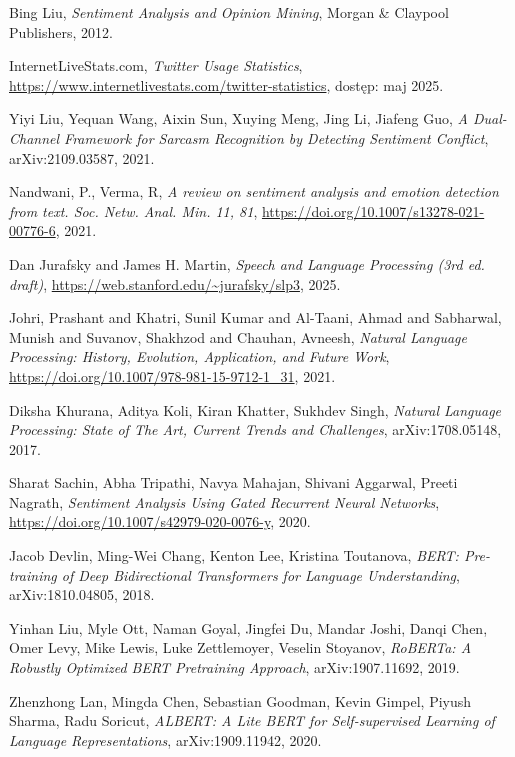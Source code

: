 Bing Liu,
\textit{Sentiment Analysis and Opinion Mining},
Morgan \& Claypool Publishers, 2012.

InternetLiveStats.com,
\textit{Twitter Usage Statistics},
\url{https://www.internetlivestats.com/twitter-statistics}, dostęp: maj 2025.

Yiyi Liu, Yequan Wang, Aixin Sun, Xuying Meng, Jing Li, Jiafeng Guo,
\textit{A Dual-Channel Framework for Sarcasm Recognition by Detecting Sentiment Conflict},
arXiv:2109.03587, 2021.

Nandwani, P., Verma, R,
\textit{A review on sentiment analysis and emotion detection from text. Soc. Netw. Anal. Min. 11, 81},
\url{https://doi.org/10.1007/s13278-021-00776-6}, 2021.

Dan Jurafsky and James H. Martin,
\textit{Speech and Language Processing (3rd ed. draft)},
\url{https://web.stanford.edu/~jurafsky/slp3}, 2025.

Johri, Prashant and Khatri, Sunil Kumar and Al-Taani, Ahmad and Sabharwal, Munish and Suvanov, Shakhzod and Chauhan, Avneesh,
\textit{Natural Language Processing: History, Evolution, Application, and Future Work},
\url{https://doi.org/10.1007/978-981-15-9712-1_31}, 2021.

Diksha Khurana, Aditya Koli, Kiran Khatter, Sukhdev Singh,
\textit{Natural Language Processing: State of The Art, Current Trends and Challenges},
arXiv:1708.05148, 2017.

Sharat Sachin, Abha Tripathi, Navya Mahajan, Shivani Aggarwal, Preeti Nagrath,
\textit{Sentiment Analysis Using Gated Recurrent Neural Networks},
\url{https://doi.org/10.1007/s42979-020-0076-y}, 2020.

Jacob Devlin, Ming-Wei Chang, Kenton Lee, Kristina Toutanova,
\textit{BERT: Pre-training of Deep Bidirectional Transformers for Language Understanding},
arXiv:1810.04805, 2018.

Yinhan Liu, Myle Ott, Naman Goyal, Jingfei Du, Mandar Joshi, Danqi Chen, Omer Levy, Mike Lewis, Luke Zettlemoyer, Veselin Stoyanov,
\textit{RoBERTa: A Robustly Optimized BERT Pretraining Approach},
arXiv:1907.11692, 2019.

Zhenzhong Lan, Mingda Chen, Sebastian Goodman, Kevin Gimpel, Piyush Sharma, Radu Soricut,
\textit{ALBERT: A Lite BERT for Self-supervised Learning of Language Representations},
 arXiv:1909.11942, 2020.

